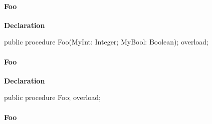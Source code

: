\documentclass{report}
\newif\ifpdf
\begin{document}
\paragraph*{Foo}\hspace*{\fill}

\label{ok_link_tag_overloads.TOverloadedMethods-Foo}
\begin{list}{}{
\setlength{\itemindent}{0cm}
\setlength{\listparindent}{0cm}
\setlength{\leftmargin}{\evensidemargin}
\addtolength{\leftmargin}{\tmplength}
\settowidth{\labelsep}{X}
\addtolength{\leftmargin}{\labelsep}
\setlength{\labelwidth}{\tmplength}
}
\item[\textbf{Declaration}\hfill]
\ifpdf
\begin{flushleft}
\fi
\begin{ttfamily}
public procedure Foo(MyInt: Integer; MyBool: Boolean); overload;\end{ttfamily}

\ifpdf
\end{flushleft}
\fi

\end{list}
\paragraph*{Foo}\hspace*{\fill}

\label{ok_link_tag_overloads.TOverloadedMethods-Foo}
\begin{list}{}{
\setlength{\itemindent}{0cm}
\setlength{\listparindent}{0cm}
\setlength{\leftmargin}{\evensidemargin}
\addtolength{\leftmargin}{\tmplength}
\settowidth{\labelsep}{X}
\addtolength{\leftmargin}{\labelsep}
\setlength{\labelwidth}{\tmplength}
}
\item[\textbf{Declaration}\hfill]
\ifpdf
\begin{flushleft}
\fi
\begin{ttfamily}
public procedure Foo; overload;\end{ttfamily}

\ifpdf
\end{flushleft}
\fi

\end{list}
\paragraph*{Foo}\hspace*{\fill}
\end{document}
